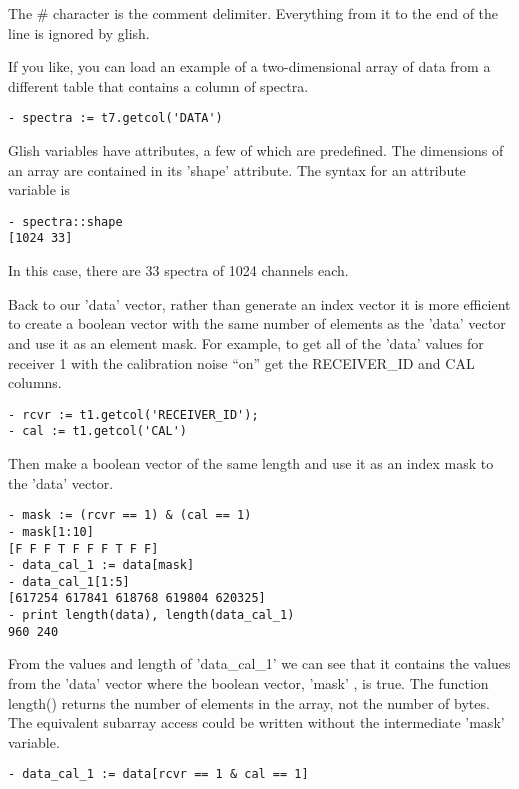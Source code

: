 The \# character is the comment delimiter.  Everything from it to the end of
the line is ignored by glish.

    If you like, you can load an example of a two-dimensional array of data
from a different table that contains a column of spectra.

\begin{verbatim}
- spectra := t7.getcol('DATA')
\end{verbatim}

    Glish variables have attributes, a few of which are predefined.  The
dimensions of an array are contained in its 'shape' attribute.  The syntax
for an attribute variable is

\begin{verbatim}
- spectra::shape
[1024 33]
\end{verbatim}

In this case, there are 33 spectra of 1024 channels each.

    Back to our 'data' vector, rather than generate an index vector it is
more efficient to create a boolean vector with the same number of elements
as the 'data' vector and use it as an element mask.  For example, to get
all of the 'data' values for receiver 1 with the calibration noise ``on'' get
the RECEIVER\_ID and CAL columns.

\begin{verbatim}
- rcvr := t1.getcol('RECEIVER_ID');
- cal := t1.getcol('CAL')
\end{verbatim}

Then make a boolean vector of the same length and use it as an index mask
to the 'data' vector.

\begin{verbatim}
- mask := (rcvr == 1) & (cal == 1)
- mask[1:10]
[F F F T F F F T F F]  
- data_cal_1 := data[mask]
- data_cal_1[1:5]
[617254 617841 618768 619804 620325]
- print length(data), length(data_cal_1)
960 240
\end{verbatim}

From the values and length of 'data\_cal\_1' we can see that it contains the
values from the 'data' vector where the boolean vector, 'mask' , is true.
The function length() returns the number of elements in the array, not the
number of bytes.  The equivalent subarray access could be written without
the intermediate 'mask' variable.

\begin{verbatim}
- data_cal_1 := data[rcvr == 1 & cal == 1]
\end{verbatim}

